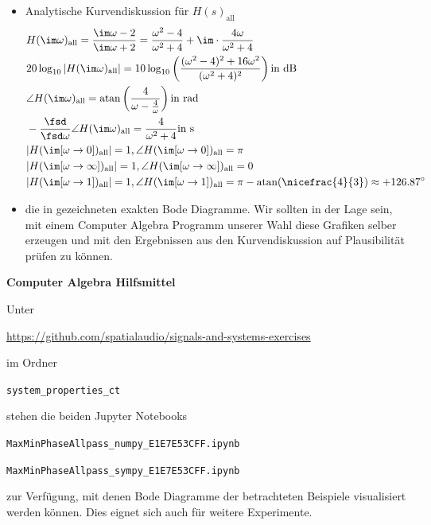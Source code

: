 \begin{itemize}
\item Analytische Kurvendiskussion für $H(s)_\mathrm{all}$
\begin{align}
&H(\im\omega)_\mathrm{all} = \frac{\im\omega-2}{\im\omega+2}=
\frac{\omega^2-4}{\omega^2+4}+
\im\cdot\frac{4\omega}{\omega^2+4}\\
&20 \log_{10}|H(\im\omega)_\mathrm{all}| =
10 \log_{10} \left(\frac{(\omega^2-4)^2+16\omega^2}{(\omega^2+4)^2}\right)\text{in dB}\\
&\angle H(\im\omega)_\mathrm{all} =
\mathrm{atan}\left(\frac{4}{\omega-\frac{4}{\omega}}\right)\text{in rad}\\
&-\frac{\fsd}{\fsd \omega} \angle H(\im\omega)_\mathrm{all}=
\frac{4}{\omega^2+4}\text{in s}\\
&|H(\im[\omega\to 0])_\mathrm{all}| = 1, \angle H(\im[\omega\to 0])_\mathrm{all} = \pi\\
&|H(\im[\omega\to\infty])_\mathrm{all}| = 1, \angle H(\im[\omega\to\infty])_\mathrm{all} = 0\\
&|H(\im[\omega\to 1])_\mathrm{all}| = 1, \angle H(\im[\omega\to 1])_\mathrm{all} = \pi - \mathrm{atan}(\nicefrac{4}{3}) \approx +126.87^\circ
\end{align}

\item die in  gezeichneten exakten
Bode Diagramme. Wir sollten in der Lage sein, mit einem Computer Algebra Programm
unserer Wahl diese Grafiken selber erzeugen und mit den Ergebnissen
aus den Kurvendiskussion auf Plausibilität prüfen zu können.

\end{itemize}

\noindent \textbf{Computer Algebra Hilfsmittel}

\noindent Unter

\url{https://github.com/spatialaudio/signals-and-systems-exercises}

\noindent im Ordner

\texttt{system\_properties\_ct}

\noindent stehen die beiden Jupyter Notebooks

\texttt{MaxMinPhaseAllpass\_numpy\_E1E7E53CFF.ipynb}

\texttt{MaxMinPhaseAllpass\_sympy\_E1E7E53CFF.ipynb}

\noindent zur Verfügung, mit denen Bode Diagramme der betrachteten Beispiele visualisiert
werden können. Dies eignet sich auch für weitere Experimente.

